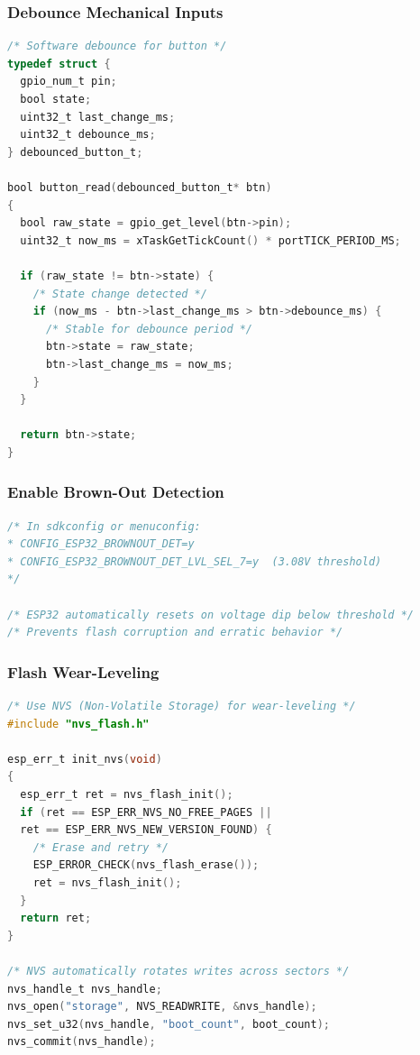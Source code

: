\subsubsection{Debounce Mechanical Inputs}

\begin{lstlisting}[language=C]
/* Software debounce for button */
typedef struct {
  gpio_num_t pin;
  bool state;
  uint32_t last_change_ms;
  uint32_t debounce_ms;
} debounced_button_t;

bool button_read(debounced_button_t* btn)
{
  bool raw_state = gpio_get_level(btn->pin);
  uint32_t now_ms = xTaskGetTickCount() * portTICK_PERIOD_MS;
  
  if (raw_state != btn->state) {
    /* State change detected */
    if (now_ms - btn->last_change_ms > btn->debounce_ms) {
      /* Stable for debounce period */
      btn->state = raw_state;
      btn->last_change_ms = now_ms;
    }
  }
  
  return btn->state;
}


\end{lstlisting}
\subsubsection{Enable Brown-Out Detection}

\begin{lstlisting}[language=C]
/* In sdkconfig or menuconfig:
* CONFIG_ESP32_BROWNOUT_DET=y
* CONFIG_ESP32_BROWNOUT_DET_LVL_SEL_7=y  (3.08V threshold)
*/

/* ESP32 automatically resets on voltage dip below threshold */
/* Prevents flash corruption and erratic behavior */


\end{lstlisting}
\subsubsection{Flash Wear-Leveling}

\begin{lstlisting}[language=C]
/* Use NVS (Non-Volatile Storage) for wear-leveling */
#include "nvs_flash.h"

esp_err_t init_nvs(void)
{
  esp_err_t ret = nvs_flash_init();
  if (ret == ESP_ERR_NVS_NO_FREE_PAGES ||
  ret == ESP_ERR_NVS_NEW_VERSION_FOUND) {
    /* Erase and retry */
    ESP_ERROR_CHECK(nvs_flash_erase());
    ret = nvs_flash_init();
  }
  return ret;
}

/* NVS automatically rotates writes across sectors */
nvs_handle_t nvs_handle;
nvs_open("storage", NVS_READWRITE, &nvs_handle);
nvs_set_u32(nvs_handle, "boot_count", boot_count);
nvs_commit(nvs_handle);


\end{lstlisting}
